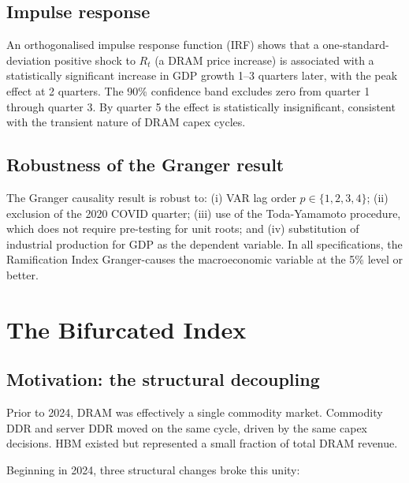 \documentclass[12pt]{article}
\theoremstyle{definition}
\begin{document}
\subsection{Impulse response}

An orthogonalised impulse response function (IRF) shows that a one-standard-deviation positive shock to $R_t$ (a DRAM price increase) is associated with a statistically significant increase in GDP growth 1--3 quarters later, with the peak effect at 2 quarters. The 90\% confidence band excludes zero from quarter 1 through quarter 3. By quarter 5 the effect is statistically insignificant, consistent with the transient nature of DRAM capex cycles.

\subsection{Robustness of the Granger result}

The Granger causality result is robust to: (i) VAR lag order $p \in \{1, 2, 3, 4\}$; (ii) exclusion of the 2020 COVID quarter; (iii) use of the Toda-Yamamoto \cite{TodaYamamoto1995} procedure, which does not require pre-testing for unit roots; and (iv) substitution of industrial production for GDP as the dependent variable. In all specifications, the Ramification Index Granger-causes the macroeconomic variable at the 5\% level or better.


\section{The Bifurcated Index}
\label{sec:bifurcated}

\subsection{Motivation: the structural decoupling}

Prior to 2024, DRAM was effectively a single commodity market. Commodity DDR and server DDR moved on the same cycle, driven by the same capex decisions. HBM existed but represented a small fraction of total DRAM revenue.

Beginning in 2024, three structural changes broke this unity:
\end{document}
